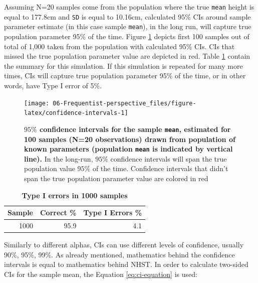 \documentclass[
]{book}
\begin{document}
Assuming N=20 samples come from the population where the true \texttt{mean} height is equal to 177.8cm and \texttt{SD} is equal to 10.16cm, calculated 95\% CIs around sample parameter estimate (in this case sample \texttt{mean}), in the long run, will capture true population parameter 95\% of the time. Figure \ref{fig:confidence-intervals} depicts first 100 samples out of total of 1,000 taken from the population with calculated 95\% CIs. CIs that missed the true population parameter value are depicted in red. Table \ref{tab:confidence-intervals-summary} contain the summary for this simulation. If this simulation is repeated for many more times, CIs will capture true population parameter 95\% of the time, or in other words, have Type I error of 5\%.

\begin{figure}

{\centering \texttt{[image: 06-Frequentist-perspective\_files/figure-latex/confidence-intervals-1]} 

}

\caption{\textbf{\(95\%\) confidence intervals for the sample \texttt{mean}, estimated for 100 samples (N=20 observations) drawn from population of known parameters (population \texttt{mean} is indicated by vertical line). }In the long-run, \(95\%\) confidence intervals will span the true population value \(95\%\) of the time. Confidence intervals that didn't span the true population parameter value are colored in red}\label{fig:confidence-intervals}
\end{figure}



\begin{table}

\caption{\label{tab:confidence-intervals-summary}\textbf{Type I errors in 1000 samples}}
\centering
\begin{tabular}[t]{rrr}
\toprule
Sample & Correct \% & Type I Errors \%\\
\midrule
1000 & 95.9 & 4.1\\
\bottomrule
\end{tabular}
\end{table}



Similarly to different alphas, CIs can use different levels of confidence, usually 90\%, 95\%, 99\%. As already mentioned, mathematics behind the confidence intervals is equal to mathematics behind NHST. In order to calculate two-sided CIs for the sample mean, the Equation \eqref{eq:ci-equation} is used:
\end{document}

